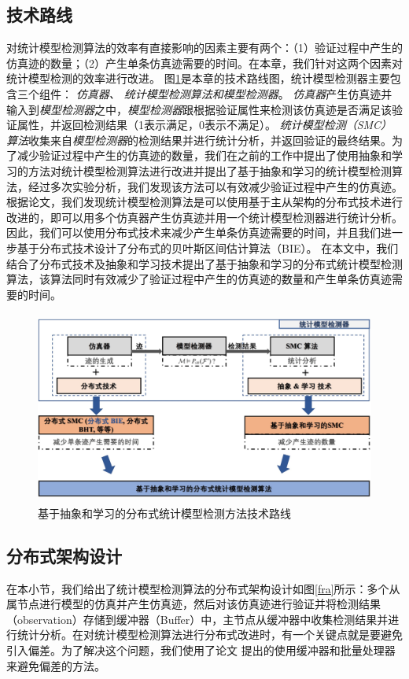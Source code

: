 \subsection{技术路线}
\label{sec:roadmap}
对统计模型检测算法的效率有直接影响的因素主要有两个：（1）验证过程中产生的仿真迹的数量；（2）产生单条仿真迹需要的时间。在本章，我们针对这两个因素对统计模型检测的效率进行改进。 图\ref{tech-map}是本章的技术路线图，统计模型检测器主要包含三个组件： \emph{仿真器、 统计模型检测算法和模型检测器}。 \emph{仿真器}产生仿真迹并输入到\emph{模型检测器}之中，\emph{模型检测器}跟根据验证属性来检测该仿真迹是否满足该验证属性，并返回检测结果（1表示满足，0表示不满足）。 \emph{统计模型检测（SMC）算法}收集来自\emph{模型检测器}的检测结果并进行统计分析，并返回验证的最终结果。为了减少验证过程中产生的仿真迹的数量，我们在之前的工作中提出了使用抽象和学习的方法对统计模型检测算法进行改进\cite{jiangkaiqiang2016}并提出了基于抽象和学习的统计模型检测算法，经过多次实验分析，我们发现该方法可以有效减少验证过程中产生的仿真迹。根据论文\cite{younes2005ymer}，我们发现统计模型检测算法是可以使用基于主从架构的分布式技术进行改进的，即可以用多个仿真器产生仿真迹并用一个统计模型检测器进行统计分析。因此，我们可以使用分布式技术来减少产生单条仿真迹需要的时间，并且我们进一步基于分布式技术设计了分布式的贝叶斯区间估计算法（BIE）。 在本文中，我们结合了分布式技术及抽象和学习技术提出了基于抽象和学习的分布式统计模型检测算法，该算法同时有效减少了验证过程中产生的仿真迹的数量和产生单条仿真迹需要的时间。
\begin{figure}[htbp]
	{
	\centering	
	\includegraphics[width=5.0in,height=2.5in]{fig/4/paper-framework.jpg}
\caption{基于抽象和学习的分布式统计模型检测方法技术路线}\label{tech-map}	
	}	
\end{figure}
\subsection{分布式架构设计}
在本小节，我们给出了统计模型检测算法的分布式架构设计如图\ref{fra}所示：多个从属节点进行模型的仿真并产生仿真迹，然后对该仿真迹进行验证并将检测结果（observation）存储到缓冲器（Buffer）中，主节点从缓冲器中收集检测结果并进行统计分析。在对统计模型检测算法进行分布式改进时，有一个关键点就是要避免引入偏差。为了解决这个问题，我们使用了论文 \cite{Bulychev2012Checking}提出的使用缓冲器和批量处理器来避免偏差的方法。

